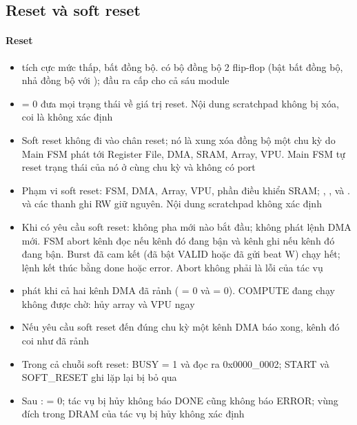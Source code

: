 \subsection{Reset và soft reset}\label{sec:4.5}

\paragraph{Reset}\label{par:4-6}
\begin{itemize}
\item {} tích cực mức thấp, bất đồng bộ.  có bộ đồng bộ 2 flip-flop (bật bất đồng bộ, nhả đồng bộ với ); đầu ra  cấp cho cả sáu module
\item {} = 0 đưa mọi trạng thái về giá trị reset. Nội dung scratchpad không bị xóa, coi là không xác định
\item Soft reset không đi vào chân reset; nó là xung xóa đồng bộ  một chu kỳ do Main FSM phát tới Register File, DMA, SRAM, Array, VPU. Main FSM tự reset trạng thái của nó ở cùng chu kỳ và không có port 
\item Phạm vi soft reset: FSM, DMA, Array, VPU, phần điều khiển SRAM; , ,  và .  và các thanh ghi RW giữ nguyên. Nội dung scratchpad không xác định
\item Khi có yêu cầu soft reset: không pha mới nào bắt đầu; không phát lệnh DMA mới. FSM abort kênh đọc nếu kênh đó đang bận và kênh ghi nếu kênh đó đang bận. Burst đã cam kết (đã bật VALID hoặc đã gửi beat W) chạy hết; lệnh kết thúc bằng done hoặc error. Abort không phải là lỗi của tác vụ
\item {} phát khi cả hai kênh DMA đã rảnh ( = 0 và  = 0). COMPUTE đang chạy không được chờ:  hủy array và VPU ngay
\item Nếu yêu cầu soft reset đến đúng chu kỳ một kênh DMA báo xong, kênh đó coi như đã rảnh
\item Trong cả chuỗi soft reset: BUSY = 1 và  đọc ra 0x0000\_0002; START và SOFT\_RESET ghi lặp lại bị bỏ qua
\item Sau :  = 0; tác vụ bị hủy không báo DONE cũng không báo ERROR; vùng đích trong DRAM của tác vụ bị hủy không xác định
\end{itemize}

